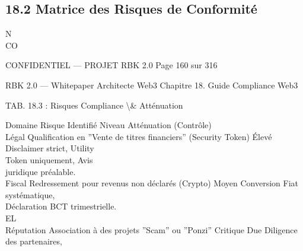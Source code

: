 \documentclass[12pt,landscape,a4paper]{article}
\newenvironment{confidential}
{\begin{tcolorbox}[
    colback=rbkred!5!white,
    colframe=rbkred!75!black,
    title=CONFIDENTIEL,
    fonttitle=\bfseries\color{white},
    coltitle=rbkred!75!black,
    breakable,
    enhanced,
    frame hidden,
    borderline west={2pt}{0pt}{rbkred!75!black}
]}
{\end{tcolorbox}}
\begin{document}
\subsection{18.2 Matrice des Risques de Conformité}
N\\
CO\\
\vspace{0.5em}
\vspace{0.5em}
\vspace{0.5em}
\vspace{0.5em}
\begin{confidential}CONFIDENTIEL — PROJET RBK 2.0                                      Page 160 sur 316\end{confidential}
RBK 2.0 — Whitepaper Architecte Web3                                                                         Chapitre 18. Guide Compliance Web3\\
\vspace{0.5em}
\vspace{0.5em}
\vspace{0.5em}
\vspace{0.5em}
\begin{center}\begin{tabular}TAB. 18.3 : Risques Compliance \textbackslash{}& Atténuation\end{tabular}\end{center}
\vspace{0.5em}
\vspace{0.5em}
Domaine       Risque Identifié                                                 Niveau Atténuation (Contrôle)\\
Légal         Qualification en ”Vente de titres financiers” (Security Token)    Élevé   Disclaimer strict, Utility\\
Token uniquement, Avis\\
juridique préalable.\\
Fiscal        Redressement pour revenus non déclarés (Crypto)                  Moyen    Conversion Fiat systématique,\\
Déclaration BCT trimestrielle.\\
\vspace{0.5em}
\vspace{0.5em}
\vspace{0.5em}
\vspace{0.5em}
EL\\
Réputation    Association à des projets ”Scam” ou ”Ponzi”                      Critique Due Diligence des partenaires,\\
\end{document}
